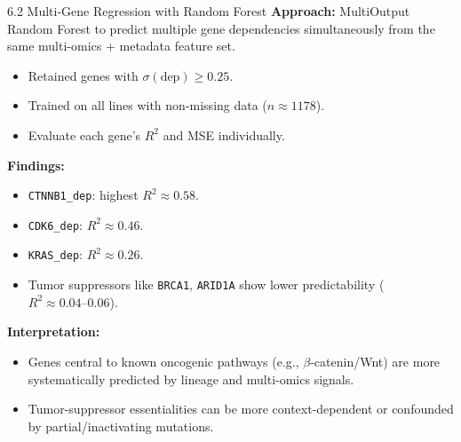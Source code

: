 \documentclass[10pt]{beamer}
\begin{document}
\begin{frame}{6.2 Multi-Gene Regression with Random Forest}
  \textbf{Approach:} MultiOutput Random Forest to predict multiple gene dependencies simultaneously from the same multi-omics + metadata feature set.

  \begin{itemize}
    \item Retained genes with \(\sigma(\text{dep}) \geq 0.25\).
    \item Trained on all lines with non-missing data (\(n \approx 1178\)).
    \item Evaluate each gene's \(R^2\) and MSE individually.
  \end{itemize}

  \vspace{0.3cm}
  \textbf{Findings:}
  \begin{itemize}
    \item \texttt{CTNNB1\_dep}: highest \(R^2 \approx 0.58\).
    \item \texttt{CDK6\_dep}: \(R^2 \approx 0.46\).
    \item \texttt{KRAS\_dep}: \(R^2 \approx 0.26\).
    \item Tumor suppressors like \texttt{BRCA1}, \texttt{ARID1A} show lower predictability (\(R^2 \approx 0.04\text{--}0.06\)).
  \end{itemize}

  \textbf{Interpretation:} 
  \begin{itemize}
    \item Genes central to known oncogenic pathways (e.g., \(\beta\)-catenin/Wnt) are more systematically predicted by lineage and multi-omics signals.
    \item Tumor-suppressor essentialities can be more context-dependent or confounded by partial/inactivating mutations.
  \end{itemize}
\end{frame}
\end{document}
